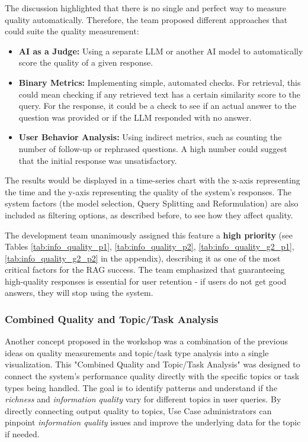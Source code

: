 \documentclass[
	english,
	ruledheaders=section,%
	class=report,%
	thesis={type=bachelor},%
	accentcolor=1b,%
	custommargins=true,%
	marginpar=false,%
	parskip=half-,%
	fontsize=11pt,%
	DIV=14,
]{tudapub}
\begin{document}
The discussion highlighted that there is no single and perfect way to measure quality automatically. Therefore, the team proposed different approaches that could suite the quality measurement:

\begin{itemize}
    \item \textbf{AI as a Judge:} Using a separate LLM or another AI model to automatically score the quality of a given response.
    \item \textbf{Binary Metrics:} Implementing simple, automated checks. For retrieval, this could mean checking if any retrieved text has a certain similarity score to the query. For the response, it could be a check to see if an actual answer to the question was provided or if the LLM responded with no answer.
    \item \textbf{User Behavior Analysis:} Using indirect metrics, such as counting the number of follow-up or rephrased questions. A high number could suggest that the initial response was unsatisfactory.
\end{itemize}

The results would be displayed in a time-series chart with the x-axis representing the time and the y-axis representing the quality of the system's responses. The system factors (the model selection, Query Splitting and Reformulation) are also included as filtering options, as described before, to see how they affect quality.

The development team unanimously assigned this feature a \textbf{high priority} (see Tables \ref{tab:info_quality_p1}, \ref{tab:info_quality_p2}, \ref{tab:info_quality_g2_p1}, \ref{tab:info_quality_g2_p2} in the appendix), describing it as one of the most critical factors for the RAG success. The team emphasized that guaranteeing high-quality responses is essential for user retention - if users do not get good answers, they will stop using the system.
\subsubsection{Combined Quality and Topic/Task Analysis}
Another concept proposed in the workshop was a combination of the previous ideas on quality measurements and topic/task type analysis into a single visualization. This "Combined Quality and Topic/Task Analysis" was designed to connect the system's performance quality directly with the specific topics or task types being handled. The goal is to identify patterns and understand if the \textit{richness} and \textit{information quality} \parencite[pp.~57--58]{DeloneMcLean2003ISSuccessTenYearUpdate} vary for different topics in user queries. By directly connecting output quality to topics, Use Case administrators can pinpoint \textit{information quality} issues and improve the underlying data for the topic if needed.
\end{document}
